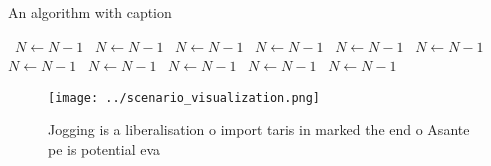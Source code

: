 \documentclass[a4paper]{article}
\begin{document}
\begin{algorithm}
\caption{An algorithm with caption}
\begin{algorithmic}
\    \State $N \gets N - 1$
\    \State $N \gets N - 1$
\    \State $N \gets N - 1$
\    \State $N \gets N - 1$
\    \State $N \gets N - 1$
\    \State $N \gets N - 1$
\    \State $N \gets N - 1$
\    \State $N \gets N - 1$
\    \State $N \gets N - 1$
\    \State $N \gets N - 1$
\    \State $N \gets N - 1$
\EndWhile
\end{algorithmic}
\end{algorithm}

\begin{figure}
\centering
\texttt{[image: ../scenario\_visualization.png]}
\caption{Jogging is a liberalisation o import taris in marked the end o Asante pe is potential eva
}
\end{figure}
 
\end{document}
